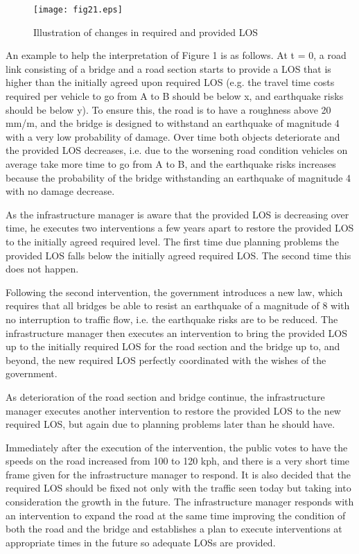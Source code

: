 \begin{figure}[h]
\texttt{[image: fig21.eps]}
\caption{Illustration of changes in required and provided LOS}\label{fig21}
\end{figure}

An example to help the interpretation of Figure 1 is as follows. At t = 0, a road link consisting of a bridge and a road section starts to provide a LOS that is higher than the initially agreed upon required LOS (e.g. the travel time costs required per vehicle to go from A to B should be below x, and earthquake risks should be below y). To ensure this, the road is to have a roughness above 20 mm/m, and the bridge is designed to withstand an earthquake of magnitude 4 with a very low probability of damage. Over time both objects deteriorate and the provided LOS decreases, i.e. due to the worsening road condition vehicles on average take more time to go from A to B, and the earthquake risks increases because the probability of the bridge withstanding an earthquake of magnitude 4 with no damage decrease. 

As the infrastructure manager is aware that the provided LOS is decreasing over time, he executes two interventions a few years apart to restore the provided LOS to the initially agreed required level. The first time due planning problems the provided LOS falls below the initially agreed required LOS. The second time this does not happen.

Following the second intervention, the government introduces a new law, which requires that all bridges be able to resist an earthquake of a magnitude of 8 with no interruption to traffic flow, i.e. the earthquake risks are to be reduced. The infrastructure manager then executes an intervention to bring the provided LOS up to the initially required LOS for the road section and the bridge up to, and beyond, the new required LOS perfectly coordinated with the wishes of the government. 

As deterioration of the road section and bridge continue, the infrastructure manager executes another intervention to restore the provided LOS to the new required LOS, but again due to planning problems later than he should have. 

Immediately after the execution of the intervention, the public votes to have the speeds on the road increased from 100 to 120 kph, and there is a very short time frame given for the infrastructure manager to respond. It is also decided that the required LOS should be fixed not only with the traffic seen today but taking into consideration the growth in the future. 
The infrastructure manager responds with an intervention to expand the road at the same time improving the condition of both the road and the bridge and establishes a plan to execute interventions at appropriate times in the future so adequate LOSs are provided. 
%


